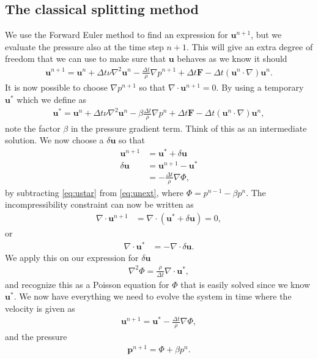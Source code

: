 \documentclass[a4paper,10pt]{article}
\renewcommand{\vec}[1]{\mathbf{#1}}
\renewcommand{\(}{\left(}
\renewcommand{\)}{\right)}
\begin{document}
\subsection{The classical splitting method}
We use the Forward Euler method to find an expression for $\vec u^{n+1}$, but we evaluate the pressure also at the time step $n+1$. This will give an extra degree of freedom that we can use to make sure that $\vec u$ behaves as we know it should
\begin{align}
  \label{eq:unext}
  \vec u^{n+1} = \vec u^{n} + \Delta t\nu\nabla^2\vec u^n - \frac{\Delta t}{\rho}\nabla p^{n+1} + \Delta t\vec F - \Delta t(\vec u^n\cdot \nabla)\vec u^n.
\end{align}
It is now possible to choose $\nabla p^{n+1}$ so that $\nabla \cdot \vec u^{n+1} = 0$. By using a temporary $\vec u^*$ which we define as
\begin{align}
  \label{eq:ustar}
  \vec u^* = \vec u^{n} + \Delta t\nu\nabla^2\vec u^n - \beta\frac{\Delta t}{\rho}\nabla p^n + \Delta t\vec F - \Delta t(\vec u^n\cdot \nabla)\vec u^n,
\end{align}
note the factor $\beta$ in the pressure gradient term. Think of this as an intermediate solution. We now choose a $\delta \vec u$ so that
\begin{align*}
  \vec u^{n+1} &= \vec u^* + \delta \vec u\\
  \delta \vec u &= \vec u^{n+1} - \vec u^*\\
  &= -\frac{\Delta t}{\rho}\nabla \Phi,
\end{align*}
by subtracting \eqref{eq:ustar} from \eqref{eq:unext}, where $\Phi = p^{n-1} - \beta p^n$. The incompressibility constraint can now be written as
\begin{align*}
  \nabla \cdot \vec u^{n+1} &= \nabla\cdot(\vec u^* + \delta \vec u) = 0,
\end{align*}
or
\begin{align*}
  \nabla \cdot \vec u^* &= -\nabla \cdot\delta \vec u.
\end{align*}
We apply this on our expression for $\delta \vec u$
\begin{align*}
  \nabla^2 \Phi = \frac{\rho}{\Delta t}\nabla \cdot \vec u^*,
\end{align*}
and recognize this as a Poisson equation for $\Phi$ that is easily solved since we know $\vec u^*$. We now have everything we need to evolve the system in time where the velocity is given as
\begin{align}
  \label{eq:u_next}
  \vec u^{n+1} = \vec u^* - \frac{\Delta t}{\rho}\nabla \Phi,
\end{align}
and the pressure
\begin{align}
  \label{eq:p_next}
  \vec p^{n+1} = \Phi + \beta p^n.
\end{align}
\end{document}
